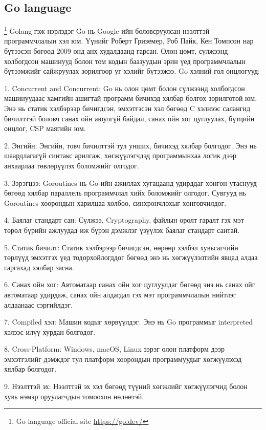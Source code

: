 \subsection{Go language}
	\footnote{Go language official site \url{https://go.dev/}}
		\quad \quad Golang гэж нэрлэдэг Go нь Google-ийн боловсруулсан нээлттэй программчлалын хэл юм. Үүнийг Роберт Гриземер, Роб Пайк, Кен Томпсон нар бүтээсэн бөгөөд 2009 онд анх худалдаанд гарсан. Олон цөмт, сүлжээнд холбогдсон машинууд болон том кодын баазуудын эрин үед программчлалын бүтээмжийг сайжруулах зорилгоор уг хэлийг бүтээжээ. Go хэлний гол онцлогууд:

		1. Concurrent and Concurrent: Go нь олон цөмт болон сүлжээнд холбогдсон машинуудаас хамгийн ашигтай программ бичихэд хялбар болгох зорилготой юм. Энэ нь статик хэлбэрээр бичигдсэн, эмхэтгэсэн хэл бөгөөд C хэлнээс салангид бичилттэй боловч санах ойн аюулгүй байдал, санах ойн хог цуглуулах, бүтцийн онцлог, CSP маягийн юм.
		
		2. Энгийн: Энгийн, товч бичилттэй тул унших, бичихэд хялбар болгодог. Энэ нь шаардлагагүй синтакс арилгаж, хөгжүүлэгчдэд программынхаа логик дээр анхаарлаа төвлөрүүлэх боломжийг олгодог.
		
		3. Зэрэгцээ: Goroutines нь Go-ийн ажиллах хугацаанд удирддаг хөнгөн утаснууд бөгөөд хялбар параллель программчлал хийх боломжийг олгодог. Сувгууд нь Goroutines хоорондын харилцаа холбоо, синхрончлохыг хөнгөвчилдөг.
		
		4. Баялаг стандарт сан: Сүлжээ, Cryptography, файлын оролт гаралт гэх мэт төрөл бүрийн ажлуудад иж бүрэн дэмжлэг үзүүлэх баялаг стандарт сантай.
		
		5. Статик бичилт: Статик хэлбэрээр бичигдсэн, өөрөөр хэлбэл хувьсагчийн төрлүүд эмхэтгэх үед тодорхойлогддог бөгөөд энэ нь хөгжүүлэлтийн явцад алдаа гаргахад хялбар засна.
		
		6. Санах ойн хог: Автоматаар санах ойн хог цуглуулдаг бөгөөд энэ нь санах ойг автоматаар удирдаж, санах ойн алдагдал гэх мэт программчлалын нийтлэг алдаанаас сэргийлдэг.
		
		7. Compiled хэл: Mашин кодыг хөрвүүлдэг. Энэ нь Go программыг interpreted хэлээс илүү хурдан болгодог.
		
		8. Cross-Platform: Windows, macOS, Linux зэрэг олон платформ дээр эмхэтгэлийг дэмждэг тул платформ хоорондын программуудыг хөгжүүлэхэд хялбар болгодог.
		
		9. Нээлттэй эх: Нээлттэй эх хэл бөгөөд түүний хөгжлийг хөгжүүлэгчид болон хувь нэмэр оруулагчдын томоохон нөлөөтэй.
		
